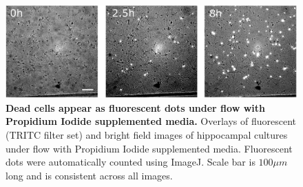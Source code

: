  \begin{figure}[h]
     \centering
     \includegraphics[width=15cm]{chapter2/figures/PIAssayIllustration/PIAssay.jpg}
     \caption[Example fluorescence images of Propidium Iodide staining under flow]{\textbf{Dead cells appear as fluorescent dots under flow with Propidium Iodide supplemented media.} Overlays of fluorescent (TRITC filter set) and bright field images of hippocampal cultures under flow with Propidium Iodide supplemented media. Fluorescent dots were automatically counted using ImageJ. Scale bar is \(100\mu m\) long and is consistent across all images.}
     \label{fig:methods:PIAssay}

 \end{figure}

